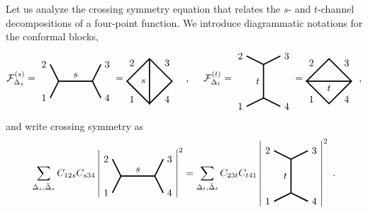 \documentclass[12pt, a4paper, notitlepage, twoside]{report}
\numberwithin{equation}{section}
\theoremstyle{break}
\begin{document}
Let us analyze the crossing symmetry equation that relates the $s$- and $t$-channel decompositions of a four-point function. We introduce diagrammatic notations for the conformal blocks, 
\begin{align}
 \mathcal{F}^{(s)}_{\Delta_s}  =  
\begin{tikzpicture}[baseline=(current  bounding  box.center), very thick, scale = .3]
\draw (-1,2) node [left] {$2$} -- (0,0) -- node [above] {$s$} (4,0) -- (5,2) node [right] {$3$};
\draw (-1,-2) node [left] {$1$} -- (0,0);
\draw (4,0) -- (5,-2) node [right] {$4$};
\end{tikzpicture}
=
\begin{tikzpicture}[baseline=(current  bounding  box.center), very thick, scale = .4]
\draw (0, -2) -- node [below left] {$1$} (-2, 0) -- node [above left] {$2$} (0, 2) -- node [above right] {$3$} (2, 0) -- node [below right] {$4$} (0, -2) -- node [left] {$s$} (0, 2); 
\end{tikzpicture}
\quad\ ,\quad\
 \mathcal{F}^{(t)}_{\Delta_t}  =  
\begin{tikzpicture}[baseline=(current  bounding  box.center), very thick, scale = .3]
 \draw (-2,3) node [left] {$2$} -- (0,2) -- node [left] {$t$} (0,-2) -- (-2, -3) node [left] {$1$};
\draw (0,2) -- (2,3) node [right] {$3$};
\draw (0,-2) -- (2, -3) node [right] {$4$};
\end{tikzpicture}
=
\begin{tikzpicture}[baseline=(current  bounding  box.center), very thick, scale = .4]
\draw (-2, 0) -- node [above left] {$2$} (0, 2) -- node [above right] {$3$} (2, 0) -- node [below right] {$4$} (0, -2) -- node [below left] {$1$} (-2, 0) -- node [below] {$t$} (2, 0); 
\end{tikzpicture}
\ \ ,
\label{ftfs}
\end{align}
and write crossing symmetry as
\begin{align}
 \sum_{\Delta_s,\bar{\Delta}_s} C_{12s} C_{s34} \left| 
 \begin{tikzpicture}[baseline=(current  bounding  box.center), very thick, scale = .3]
\draw (-1,2) node [left] {$2$} -- (0,0) -- node [above] {$s$} (4,0) -- (5,2) node [right] {$3$};
\draw (-1,-2) node [left] {$1$} -- (0,0);
\draw (4,0) -- (5,-2) node [right] {$4$};
\end{tikzpicture} 
\right|^2 = \sum_{\Delta_t,\bar{\Delta}_t} C_{23t}C_{t41} \left|
\begin{tikzpicture}[baseline=(current  bounding  box.center), very thick, scale = .3]
 \draw (-2,3) node [left] {$2$} -- (0,2) -- node [left] {$t$} (0,-2) -- (-2, -3) node [left] {$1$};
\draw (0,2) -- (2,3) node [right] {$3$};
\draw (0,-2) -- (2, -3) node [right] {$4$};
\end{tikzpicture}
\right|^2\ .
\label{csd}
\end{align}
\end{document}
